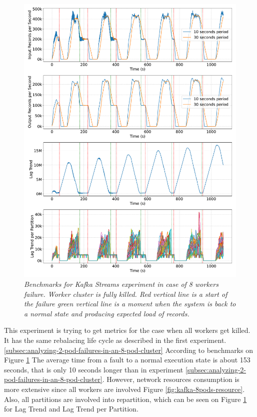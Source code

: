 \begin{figure}[H]
    \centering
    \includegraphics[width=1\textwidth]{figures/kstreams-8pods/kafka_8_pods_plot_impact}
    \caption{\textit{Benchmarks for Kafka Streams experiment in case of 8 workers failure.
    Worker cluster is fully killed. Red vertical line is a start of the failure green vertical line is a moment when the system is back
to a normal state and producing expected load of records.}}
    \label{fig:kafka-8pods-impact}
\end{figure}

This experiment is trying to get metrics for the case when all workers get killed.
It has the same rebalacing life cycle as described in the first experiment. \ref{subsec:analyzing-2-pod-failures-in-an-8-pod-cluster}
According to benchmarks on Figure \ref{fig:kafka-8pods-impact} The average time from a fault to a normal execution state is about 153 seconds,
that is only 10 seconds longer than in experiment \ref{subsec:analyzing-2-pod-failures-in-an-8-pod-cluster}.
However, network resources consumption is more extensive since all workers are involved Figure \ref{fig:kafka-8pods-resource}.
Also, all partitions are involved into repartition, which can be seen on Figure \ref{fig:kafka-8pods-impact}
for Lag Trend and Lag Trend per Partition.


